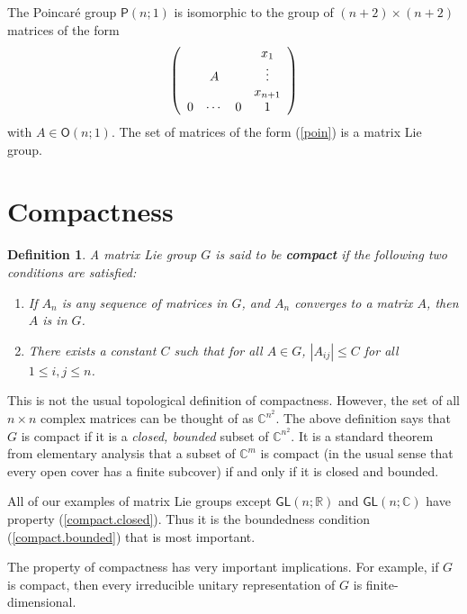 \documentclass{amsbook}
\theoremstyle{plain}
\newtheorem{definition}[theorem]{Definition}
\numberwithin{equation}{chapter}
\numberwithin{theorem}{chapter}
\begin{document}
The Poincar\'{e} group $\mathsf{P}(n;1)$ is isomorphic to the group of
$(n+2)\times(n+2)$ matrices of the form
\begin{equation}
\left(
\begin{array}
[c]{cccc}%
&  &  & x_{1}\\
& A &  & \vdots\\
&  &  &  x_{n+1}\\
0 & \cdots & 0 & 1
\end{array}
\right) \label{poin}%
\end{equation}
with $A\in\mathsf{O}(n;1)$. The set of matrices of the form (\ref{poin}) is a
matrix Lie group.

\section{Compactness}

\begin{definition}
A matrix Lie group $G$ is said to be \textbf{compact} if the following two
conditions are satisfied:

\begin{enumerate}
\item \label{compact.closed}If $A_{n}$ is any sequence of matrices in $G$, and
$A_{n}$ converges to a matrix $A$, then $A$ is in $G$.

\item \label{compact.bounded}There exists a constant $C$ such that for all
$A\in G$, $\left|  A_{ij}\right|  \leq C$ for all $1\leq i,j\leq n$.
\end{enumerate}
\end{definition}

This is not the usual topological definition of compactness. However, the set
of all $n\times n$ complex matrices can be thought of as $\mathbb{C}^{n^{2}}$.
The above definition says that $G$ is compact if it is a \textit{closed,
bounded} subset of $\mathbb{C}^{n^{2}}$. It is a standard theorem from
elementary analysis that a subset of $\mathbb{C}^{m}$ is compact (in the usual
sense that every open cover has a finite subcover) if and only if it is closed
and bounded.

All of our examples of matrix Lie groups except $\mathsf{GL}(n;\mathbb{R})$
and $\mathsf{GL}(n;\mathbb{C})$ have property (\ref{compact.closed}). Thus it
is the boundedness condition (\ref{compact.bounded}) that is most important.

The property of compactness has very important implications. For example, if
$G$ is compact, then every irreducible unitary representation of $G$ is finite-dimensional.
\end{document}
